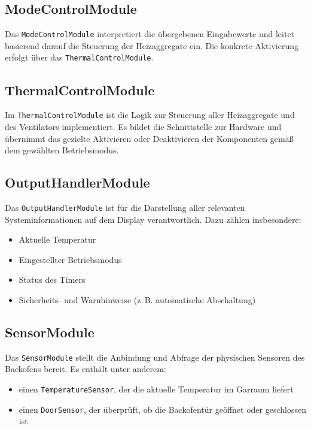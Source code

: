 \documentclass[a4paper,12pt]{article}
\begin{document}
\subsection*{ModeControlModule}
Das \texttt{ModeControlModule} interpretiert die übergebenen Eingabewerte und leitet basierend darauf die Steuerung der Heizaggregate ein. Die konkrete Aktivierung erfolgt über das \texttt{ThermalControlModule}.

\subsection*{ThermalControlModule}
Im \texttt{ThermalControlModule} ist die Logik zur Steuerung aller Heizaggregate und des Ventilators implementiert. Es bildet die Schnittstelle zur Hardware und übernimmt das gezielte Aktivieren oder Deaktivieren der Komponenten gemäß dem gewählten Betriebsmodus.

\subsection*{OutputHandlerModule}
Das \texttt{OutputHandlerModule} ist für die Darstellung aller relevanten Systeminformationen auf dem Display verantwortlich. Dazu zählen insbesondere:
\begin{itemize}
    \item Aktuelle Temperatur
    \item Eingestellter Betriebsmodus
    \item Status des Timers
    \item Sicherheits- und Warnhinweise (z.\,B. automatische Abschaltung)
\end{itemize}

\subsection*{SensorModule}
Das \texttt{SensorModule} stellt die Anbindung und Abfrage der physischen Sensoren des Backofens bereit. Es enthält unter anderem:
\begin{itemize}
    \item einen \texttt{TemperatureSensor}, der die aktuelle Temperatur im Garraum liefert
    \item einen \texttt{DoorSensor}, der überprüft, ob die Backofentür geöffnet oder geschlossen ist
\end{itemize}
\end{document}
